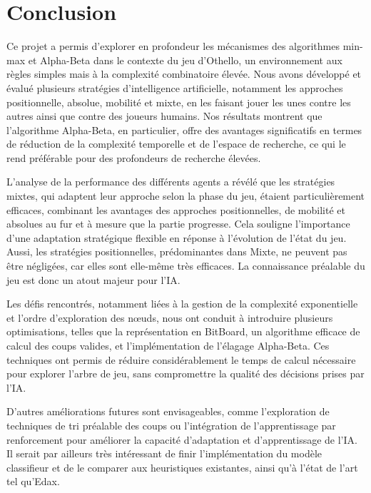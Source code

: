\chapter{Conclusion}
\label{chap:conclusion}

Ce projet a permis d'explorer en profondeur les mécanismes des algorithmes min-max et Alpha-Beta dans le contexte du jeu d'Othello, un environnement aux règles simples mais à la complexité combinatoire élevée. Nous avons développé et évalué plusieurs stratégies d'intelligence artificielle, notamment les approches positionnelle, absolue, mobilité et mixte, en les faisant jouer les unes contre les autres ainsi que contre des joueurs humains. Nos résultats montrent que l'algorithme Alpha-Beta, en particulier, offre des avantages significatifs en termes de réduction de la complexité temporelle et de l'espace de recherche, ce qui le rend préférable pour des profondeurs de recherche élevées.

L'analyse de la performance des différents agents a révélé que les stratégies mixtes, qui adaptent leur approche selon la phase du jeu, étaient particulièrement efficaces, combinant les avantages des approches positionnelles, de mobilité et absolues au fur et à mesure que la partie progresse. Cela souligne l'importance d'une adaptation stratégique flexible en réponse à l'évolution de l'état du jeu. Aussi, les stratégies positionnelles, prédominantes dans Mixte, ne peuvent pas être négligées, car elles sont elle-même très efficaces. La connaissance préalable du jeu est donc un atout majeur pour l'IA.

Les défis rencontrés, notamment liées à la gestion de la complexité exponentielle et l'ordre d'exploration des nœuds, nous ont conduit à introduire plusieurs optimisations, telles que la représentation en BitBoard, un algorithme efficace de calcul des coups valides, et l'implémentation de l'élagage Alpha-Beta. Ces techniques ont permis de réduire considérablement le temps de calcul nécessaire pour explorer l'arbre de jeu, sans compromettre la qualité des décisions prises par l'IA.

D'autres améliorations futures sont envisageables, comme l'exploration de techniques de tri préalable des coups ou l'intégration de l'apprentissage par renforcement pour améliorer la capacité d'adaptation et d'apprentissage de l'IA. Il serait par ailleurs très intéressant de finir l'implémentation du modèle classifieur et de le comparer aux heuristiques existantes, ainsi qu'à l'état de l'art tel qu'Edax.

